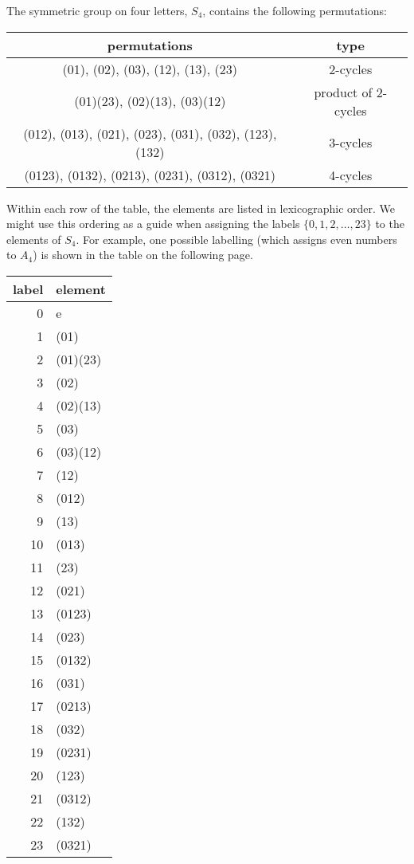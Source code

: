
The symmetric group on four letters, $S_4$, contains the following permutations:
\begin{center}
\begin{tabular}{|c|c|}
\hline
permutations & type\\[4pt]
\hline
(01), (02), (03), (12), (13), (23) & 2-cycles \\[4pt]
(01)(23), (02)(13), (03)(12) & product of 2-cycles \\[4pt]
(012), (013), (021), (023), (031), (032), (123), (132) &  3-cycles \\[4pt]
(0123), (0132), (0213), (0231), (0312), (0321) & 4-cycles \\[4pt]
\hline
\end{tabular}
\end{center}

Within each row of the table, the elements are listed in lexicographic order.  We might
use this ordering as a guide when assigning the labels $\{0, 1, 2, \ldots, 23\}$ to
the elements of $S_4$.  For example, one possible labelling 
(which assigns even numbers to $A_4$) is shown in the table on the following page.
\\
\begin{tabular}{|r|l|}
\hline
label& element \\
\hline
0& e \\
1&(01)\\
2&(01)(23)\\
3&(02)\\
4&(02)(13)\\
5&(03)\\
6&(03)(12)\\
7&(12)\\
8&(012)\\
9&(13)\\
10&(013)\\
11&(23)\\
12&(021)\\
13&(0123)\\
14&(023)\\
15&(0132)\\
16&(031)\\
17&(0213)\\
18&(032)\\
19&(0231)\\
20&(123)\\
21&(0312)\\
22&(132)\\
23&(0321)\\
\hline
\end{tabular}


